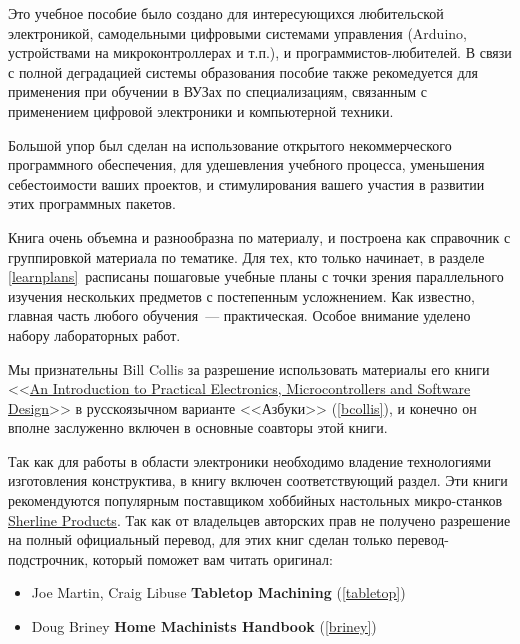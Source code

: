 
Это учебное пособие было создано для интересующихся любительской электроникой,
самодельными цифровыми системами управления (Arduino, устройствами на
микроконтроллерах и т.п.), и программистов-любителей. В связи с полной
деградацией системы образования пособие также рекомедуется для применения при
обучении в ВУЗах по специализациям, связанным с применением цифровой электроники
и компьютерной техники.

Большой упор был сделан на использование открытого некоммерческого программного
обеспечения, для удешевления учебного процесса, уменьшения себестоимости ваших
проектов, и
стимулирования вашего участия в развитии этих программных пакетов.

Книга очень объемна и разнообразна по материалу, и построена как справочник с
группировкой материала по тематике. Для тех, кто только начинает, в разделе
\ref{learnplans}\ расписаны пошаговые учебные планы с точки зрения параллельного
изучения нескольких предметов с постепенным усложнением. Как известно, главная часть любого обучения\
--- практическая. Особое внимание уделено набору лабораторных работ.

\bigskip
Мы признательны Bill Collis за разрешение использовать материалы его книги
<<\href{www.techideas.co.nz}{An Introduction to
Practical Electronics,
Microcontrollers and
Software Design}>> \cite{bcollis} в
русскоязычном варианте <<Азбуки>> (\ref{bcollis}), и конечно он вполне
заслуженно включен в основные соавторы этой книги.

\bigskip
Так как для работы в области электроники необходимо владение технологиями
изготовления конструктива, в книгу включен соответствующий раздел. 
Эти книги рекомендуются популярным поставщиком хоббийных настольных
микро-станков \href{http://sherline.com/}{Sherline Products}. Так как от
владельцев авторских прав не получено разрешение на полный официальный перевод,
для этих книг сделан только перевод-подстрочник, который поможет вам читать
оригинал:
\begin{itemize}
  \item Joe Martin, Craig Libuse \textbf{Tabletop Machining}
  \cite{tabletop} (\ref{tabletop})
  \item Doug Briney \textbf{Home Machinists Handbook}
  \cite{briney} (\ref{briney})
\end{itemize}

